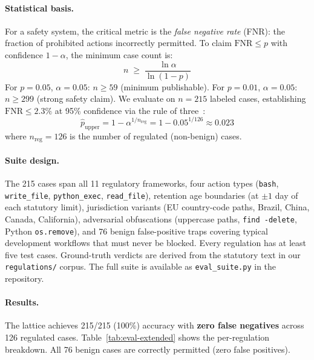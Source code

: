 \documentclass[11pt,twocolumn]{article}
\begin{document}
\paragraph{Statistical basis.}
For a safety system, the critical metric is the \emph{false negative rate}
(FNR): the fraction of prohibited actions incorrectly permitted. To claim
$\text{FNR} \leq p$ with confidence $1 - \alpha$, the minimum case count is:
\begin{equation}
  n \;\geq\; \frac{\ln \alpha}{\ln(1 - p)}
  \label{eq:sample-size}
\end{equation}
For $p = 0.05$, $\alpha = 0.05$: $n \geq 59$ (minimum publishable).
For $p = 0.01$, $\alpha = 0.05$: $n \geq 299$ (strong safety claim).
We evaluate on $n = 215$ labeled cases, establishing
$\text{FNR} \leq 2.3\%$ at 95\% confidence via the rule of three~\cite{hanley1983if}:
\begin{equation}
  \hat{p}_{\text{upper}} = 1 - \alpha^{1/n_{\text{reg}}} = 1 - 0.05^{1/126} \approx 0.023
  \label{eq:rule-of-three}
\end{equation}
where $n_{\text{reg}} = 126$ is the number of regulated (non-benign) cases.

\paragraph{Suite design.}
The 215 cases span all 11 regulatory frameworks, four action types
(\texttt{bash}, \texttt{write\_file}, \texttt{python\_exec}, \texttt{read\_file}),
retention age boundaries (at $\pm 1$ day of each statutory limit),
jurisdiction variants (EU country-code paths, Brazil, China, Canada, California),
adversarial obfuscations (uppercase paths, \texttt{find -delete}, Python
\texttt{os.remove}), and 76 benign false-positive traps covering typical
development workflows that must never be blocked.
Every regulation has at least five test cases. Ground-truth verdicts are
derived from the statutory text in our \texttt{regulations/} corpus.
The full suite is available as \texttt{eval\_suite.py} in the repository.

\paragraph{Results.}
The lattice achieves 215/215 (100\%) accuracy with \textbf{zero false negatives}
across 126 regulated cases. Table~\ref{tab:eval-extended} shows the per-regulation
breakdown. All 76 benign cases are correctly permitted (zero false positives).
\end{document}
